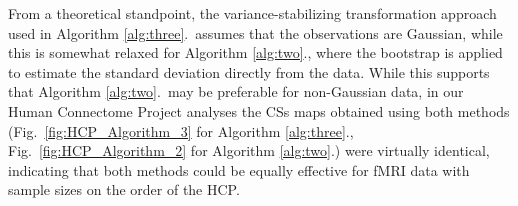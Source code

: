 From a theoretical standpoint, the variance-stabilizing transformation approach used in Algorithm \ref{alg:three}.\ assumes that the observations are Gaussian, while this is somewhat relaxed for Algorithm \ref{alg:two}., where the bootstrap is applied to estimate the standard deviation directly from the data. While this supports that Algorithm \ref{alg:two}.\ may be preferable for non-Gaussian data, in our Human Connectome Project analyses the CSs maps obtained using both methods (Fig.\ \ref{fig:HCP_Algorithm_3} for Algorithm \ref{alg:three}., Fig.\ \ref{fig:HCP_Algorithm_2} for Algorithm \ref{alg:two}.) were virtually identical, indicating that both methods could be equally effective for fMRI data with sample sizes on the order of the HCP. 
